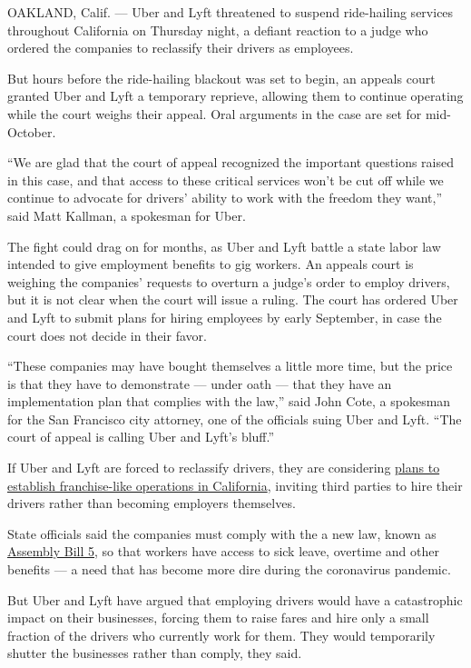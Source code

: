 OAKLAND, Calif. --- Uber and Lyft threatened to suspend ride-hailing
services throughout California on Thursday night, a defiant reaction to
a judge who ordered the companies to reclassify their drivers as
employees.

But hours before the ride-hailing blackout was set to begin, an appeals
court granted Uber and Lyft a temporary reprieve, allowing them to
continue operating while the court weighs their appeal. Oral arguments
in the case are set for mid-October.

``We are glad that the court of appeal recognized the important
questions raised in this case, and that access to these critical
services won't be cut off while we continue to advocate for drivers'
ability to work with the freedom they want,'' said Matt Kallman, a
spokesman for Uber.

The fight could drag on for months, as Uber and Lyft battle a state
labor law intended to give employment benefits to gig workers. An
appeals court is weighing the companies' requests to overturn a judge's
order to employ drivers, but it is not clear when the court will issue a
ruling. The court has ordered Uber and Lyft to submit plans for hiring
employees by early September, in case the court does not decide in their
favor.

``These companies may have bought themselves a little more time, but the
price is that they have to demonstrate --- under oath --- that they have
an implementation plan that complies with the law,'' said John Cote, a
spokesman for the San Francisco city attorney, one of the officials
suing Uber and Lyft. ``The court of appeal is calling Uber and Lyft's
bluff.''

If Uber and Lyft are forced to reclassify drivers, they are considering
\href{https://www.nytimes3xbfgragh.onion/2020/08/18/technology/uber-lyft-franchise-california.html}{plans
to establish franchise-like operations in California}, inviting third
parties to hire their drivers rather than becoming employers themselves.

State officials said the companies must comply with the a new law, known
as
\href{https://www.nytimes3xbfgragh.onion/2019/09/11/technology/california-gig-economy-bill.html}{Assembly
Bill 5}, so that workers have access to sick leave, overtime and other
benefits --- a need that has become more dire during the coronavirus
pandemic.

But Uber and Lyft have argued that employing drivers would have a
catastrophic impact on their businesses, forcing them to raise fares and
hire only a small fraction of the drivers who currently work for them.
They would temporarily shutter the businesses rather than comply, they
said.

